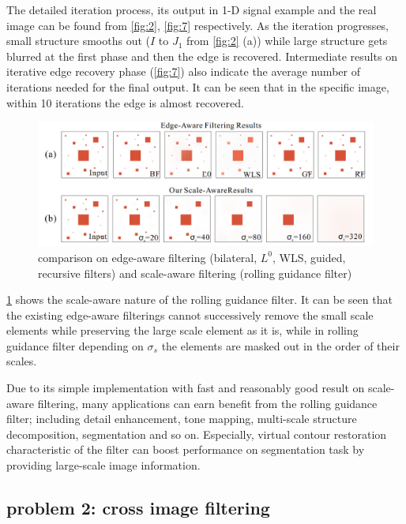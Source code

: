 \documentclass[extendedabs]{bmvc2k}
\begin{document}
The detailed iteration process, its output in 1-D signal example and the real image can be
found from \figurename{\ref{fig:2}}, \figurename{\ref{fig:7}} respectively.
As the iteration progresses, small structure smooths out ($I$ to $J_1$ from 
\figurename{\ref{fig:2}} (a)) while large structure gets blurred
at the first phase and then the edge is recovered.
Intermediate results on iterative edge recovery phase (\figurename{\ref{fig:7}}) also indicate 
the average number of iterations needed for the final output. It can be seen that in the
specific image, within 10 iterations the edge is almost recovered.

\begin{figure}[h]
    \centering
    \includegraphics[width=\linewidth]{hw2_1_8}
    \caption{comparison on edge-aware filtering (bilateral, $L^0$, WLS, guided, recursive filters) 
    and scale-aware filtering (rolling guidance filter)}
    \label{fig:8}
\end{figure}

\figurename{\ref{fig:8}} shows the scale-aware nature of the rolling guidance filter.
It can be seen that the existing edge-aware filterings cannot successively remove the small scale
elements while preserving the large scale element as it is, while in rolling guidance filter
depending on $\sigma_s$ the elements are masked out in the order of their scales. 

Due to its simple implementation with fast and reasonably good result on scale-aware
filtering, many applications can earn benefit from the rolling guidance filter; including
detail enhancement, tone mapping, multi-scale structure decomposition, segmentation
and so on. Especially, virtual contour restoration characteristic of the filter can
boost performance on segmentation task by providing large-scale image information.

\pagebreak
\subsection*{problem 2: cross image filtering}
\end{document}
